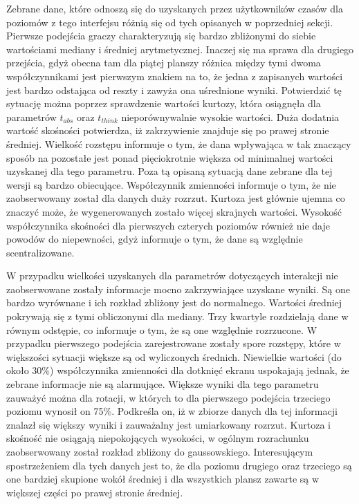 \documentclass[a4paper,12pt,numbers=noenddot]{report}
\begin{document}
Zebrane dane, które odnoszą się do uzyskanych przez użytkowników czasów dla poziomów z tego interfejsu różnią się od tych opisanych w poprzedniej sekcji. Pierwsze podejścia graczy charakteryzują się bardzo zbliżonymi do siebie wartościami mediany i średniej arytmetycznej. Inaczej się ma sprawa dla drugiego przejścia, gdyż obecna tam dla piątej planszy różnica między tymi dwoma współczynnikami jest pierwszym znakiem na to, że jedna z zapisanych wartości jest bardzo odstająca od reszty i zawyża ona uśrednione wyniki. Potwierdzić tę sytuację można poprzez sprawdzenie wartości kurtozy, która osiągnęła dla parametrów $t_{abs}$ oraz $t_{think}$ nieporównywalnie wysokie wartości. Duża dodatnia wartość skośności potwierdza, iż zakrzywienie znajduje się po prawej stronie średniej. Wielkość rozstępu informuje o tym, że dana wpływająca w tak znaczący sposób na pozostałe jest ponad pięciokrotnie większa od minimalnej wartości uzyskanej dla tego parametru. Poza tą opisaną sytuacją dane zebrane dla tej wersji są bardzo obiecujące. 
Współczynnik zmienności informuje o tym, że nie zaobserwowany został dla danych duży rozrzut. Kurtoza jest głównie ujemna co znaczyć może, że wygenerowanych zostało więcej skrajnych wartości. Wysokość współczynnika skośności dla pierwszych czterych poziomów również nie daje powodów do niepewności, gdyż informuje o tym, że dane są względnie scentralizowane.

W przypadku wielkości uzyskanych dla parametrów dotyczących interakcji nie zaobserwowane zostały informacje mocno zakrzywiające uzyskane wyniki. Są one bardzo wyrównane i ich rozkład zbliżony jest do normalnego. Wartości średniej pokrywają się z tymi obliczonymi dla mediany. Trzy kwartyle rozdzielają dane w równym odstępie, co informuje o tym, że są one względnie rozrzucone. W przypadku pierwszego podejścia zarejestrowane zostały spore rozstępy, które w większości sytuacji większe są od wyliczonych średnich. Niewielkie wartości (do około 30\%) współczynnika zmienności dla dotknięć ekranu uspokajają jednak, że zebrane informacje nie są alarmujące. Większe wyniki dla tego parametru zauważyć można dla rotacji, w których to dla pierwszego podejścia trzeciego poziomu wynosił on 75\%. Podkreśla on, iż w zbiorze danych dla tej informacji znalazł się większy wyniki i zauważalny jest umiarkowany rozrzut. Kurtoza i skośność nie osiągają niepokojących wysokości, w ogólnym rozrachunku zaobserwowany został rozkład zbliżony do gaussowskiego. Interesującym spostrzeżeniem dla tych danych jest to, że dla poziomu drugiego oraz trzeciego są one bardziej skupione wokół średniej i dla wszystkich plansz zawarte są w większej części po prawej stronie średniej.\\
\end{document}
